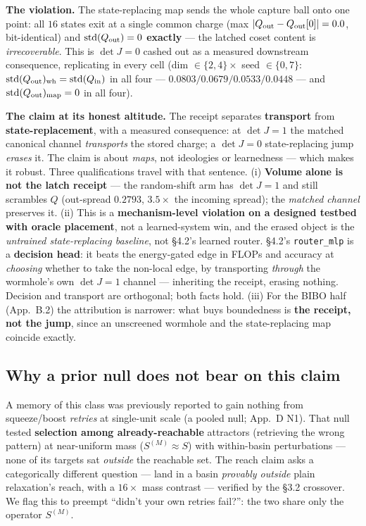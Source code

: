 \documentclass[11pt]{article}
\newcommand{\detJ}{\det J}
\begin{document}
\textbf{The violation.} The state-replacing map sends the whole capture ball onto one point: all $16$ states exit at a single common charge (max $|Q_{\rm out}-Q_{\rm out}[0]|=0.0$, bit-identical) and $\mathrm{std}(Q_{\rm out})=0$ \textbf{exactly} --- the latched coset content is \emph{irrecoverable}. This is $\detJ=0$ cashed out as a measured downstream consequence, replicating in every cell (dim $\in\{2,4\}\times$ seed $\in\{0,7\}$: $\mathrm{std}(Q_{\rm out})_{\rm wh}=\mathrm{std}(Q_{\rm in})$ in all four --- $0.0803/0.0679/0.0533/0.0448$ --- and $\mathrm{std}(Q_{\rm out})_{\rm map}=0$ in all four).

\textbf{The claim at its honest altitude.} The receipt separates \textbf{transport} from \textbf{state-replacement}, with a measured consequence: at $\detJ=1$ the matched canonical channel \emph{transports} the stored charge; a $\detJ=0$ state-replacing jump \emph{erases} it. The claim is about \emph{maps}, not ideologies or learnedness --- which makes it robust. Three qualifications travel with that sentence. (i) \textbf{Volume alone is not the latch receipt} --- the random-shift arm has $\detJ=1$ and still scrambles $Q$ (out-spread $0.2793$, $3.5\times$ the incoming spread); the \emph{matched channel} preserves it. (ii) This is a \textbf{mechanism-level violation on a designed testbed with oracle placement}, not a learned-system win, and the erased object is the \emph{untrained state-replacing baseline}, not \S4.2's learned router. \S4.2's \texttt{router\_mlp} is a \textbf{decision head}: it beats the energy-gated edge in FLOPs and accuracy at \emph{choosing} whether to take the non-local edge, by transporting \emph{through} the wormhole's own $\detJ=1$ channel --- inheriting the receipt, erasing nothing. Decision and transport are orthogonal; both facts hold. (iii) For the BIBO half (App.~B.2) the attribution is narrower: what buys boundedness is \textbf{the receipt, not the jump}, since an unscreened wormhole and the state-replacing map coincide exactly.

\subsection{Why a prior null does not bear on this claim}
A memory of this class was previously reported to gain nothing from squeeze/boost \emph{retries} at single-unit scale (a pooled null; App.~D N1). That null tested \textbf{selection among already-reachable} attractors (retrieving the wrong pattern) at near-uniform mass ($S^{(M)}\approx S$) with within-basin perturbations --- none of its targets sat \emph{outside} the reachable set. The reach claim asks a categorically different question --- land in a basin \emph{provably outside} plain relaxation's reach, with a $16\times$ mass contrast --- verified by the \S3.2 crossover. We flag this to preempt ``didn't your own retries fail?'': the two share only the operator $S^{(M)}$.
\end{document}
